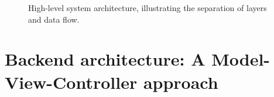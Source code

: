 \begin{figure}[H]
    \centering
    \begin{tikzpicture}[
        node distance=2.5cm and 3cm
    ]






    \end{tikzpicture}
    \caption{High-level system architecture, illustrating the separation of layers and data flow.}
    \label{fig:high-level-arch}
\end{figure}

\section{Backend architecture: A Model-View-Controller approach}


